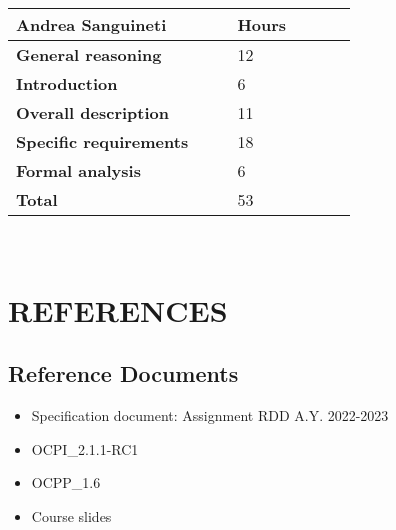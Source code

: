 \begin{table}[H]
\centering 
    \begin{tabular}{| p{0.55\linewidth} | p{0.30\linewidth} |}
    \hline
    \rowcolor{bluepoli!40}
    \textbf{Andrea Sanguineti} & \textbf{Hours}\T\B \\    
    \hline \hline
    \textbf{General reasoning} & 12 \T\B \\
    \hline 
    \textbf{Introduction} & 6 \T\B \\
    \hline 
    \textbf{Overall description} & 11 \T\B \\
    \hline 
    \textbf{Specific requirements} & 18 \T\B \\
    \hline 
    \textbf{Formal analysis} & 6 \T\B \\
    \hline
    \textbf{Total} & 53 \T\B \\
    \hline
    \end{tabular}
    \\[10pt]
\end{table}

\restoregeometry
\chapter{REFERENCES}
\label{ch:references}%
\section{Reference Documents}
\begin{itemize}
  \item Specification document: Assignment RDD A.Y. 2022-2023
  \item OCPI\_2.1.1-RC1
  \item OCPP\_1.6
  \item Course slides
\end{itemize}

